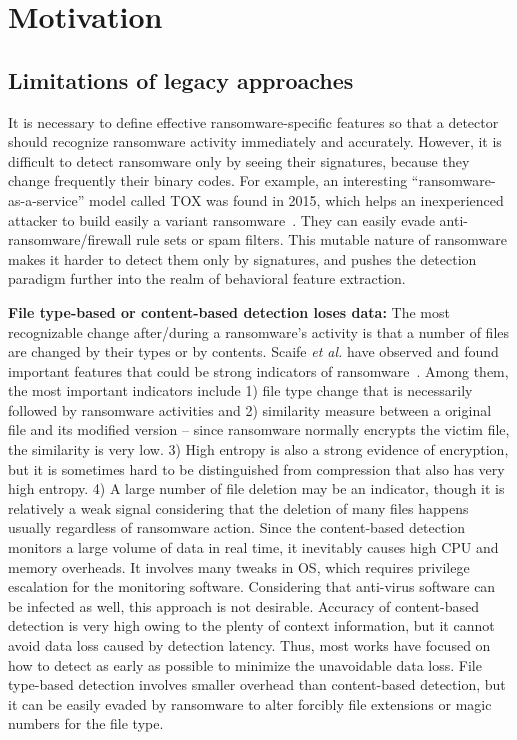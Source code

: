 \documentclass[conference]{IEEEtran}
\newcommand{\etal}{{\it et al.}\xspace}
\begin{document}
\section{Motivation}

\subsection{Limitations of legacy approaches}

It is necessary to define effective ransomware-specific features so
that a detector should recognize ransomware activity immediately
and accurately.  However, it is difficult to detect ransomware only
by seeing their signatures, because they change frequently their
binary codes.  For example,  an interesting
``ransomware-as-a-service'' model called TOX was found in 2015,
which helps an inexperienced attacker to build easily a variant
ransomware~\cite{walter15}.  They can easily evade
anti-ransomware/firewall rule sets or spam filters.  This mutable
nature of ransomware makes it harder to detect them only by
signatures, and pushes the detection paradigm further into the
realm of behavioral feature extraction.

{\bf File type-based or content-based detection loses data:} 
The most recognizable change after/during a ransomware's activity
is that a number of files are changed by their types or by
contents.  Scaife \etal have observed and found important features
that could be strong indicators of ransomware~\cite{scaife16}.
Among them, the most important indicators include 1) file type
change that is necessarily followed by ransomware activities and 2)
similarity measure between a original file and its modified version
-- since ransomware normally encrypts the victim file, the
similarity is very low.  3) High entropy is also a strong evidence
of encryption, but it is sometimes hard to be distinguished from
compression that also has very high entropy. 4) A large number of
file deletion may be an indicator, though it is relatively a weak
signal considering that the deletion of many files happens usually
regardless of ransomware action.  Since the content-based detection
monitors a large volume of data in real time, it inevitably causes
high CPU and memory overheads.  It involves many tweaks in OS,
which requires privilege escalation for the monitoring software.
Considering that anti-virus software can be infected as well, this
approach is not desirable.  Accuracy of content-based detection is
very high owing to the plenty of context information, but it cannot
avoid data loss caused by detection latency. Thus, most works have
focused on how to detect as early as possible to minimize the
unavoidable data loss.  File type-based detection involves smaller
overhead than content-based detection, but it can be easily evaded
by ransomware to alter forcibly file extensions or magic numbers
for the file type.
\end{document}
